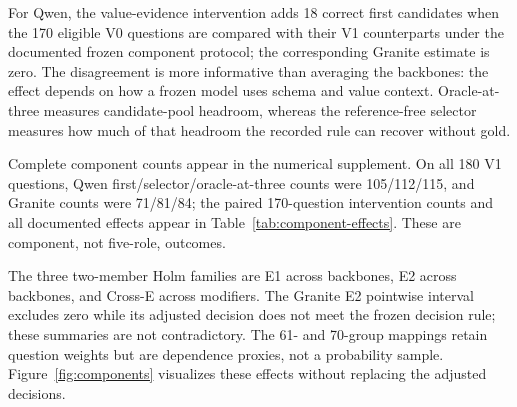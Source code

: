 \documentclass[information,article,submit,moreauthors]{Definitions/mdpi}
\begin{document}
For Qwen, the value-evidence intervention adds 18 correct first candidates when the 170 eligible V0 questions are compared with their V1 counterparts under the documented frozen component protocol; the corresponding Granite estimate is zero. The disagreement is more informative than averaging the backbones: the effect depends on how a frozen model uses schema and value context. Oracle-at-three measures candidate-pool headroom, whereas the reference-free selector measures how much of that headroom the recorded rule can recover without gold.

Complete component counts appear in the numerical supplement. On all 180 V1 questions, Qwen first/selector/oracle-at-three counts were 105/112/115, and Granite counts were 71/81/84; the paired 170-question intervention counts and all documented effects appear in Table~\ref{tab:component-effects}. These are component, not five-role, outcomes.

\begin{table}[htbp]
\caption{Complete component-effect families. Intervals are pointwise group-composition sensitivity summaries, not simultaneous intervals and not inversions of the Holm tests. Each family contains the two displayed members indicated by its identifier.}
\label{tab:component-effects}\centering\scriptsize
{}
\end{table}

The three two-member Holm families are E1 across backbones, E2 across backbones, and Cross-E across modifiers. The Granite E2 pointwise interval excludes zero while its adjusted decision does not meet the frozen decision rule; these summaries are not contradictory. The 61- and 70-group mappings retain question weights but are dependence proxies, not a probability sample. Figure~\ref{fig:components} visualizes these effects without replacing the adjusted decisions.
\end{document}
